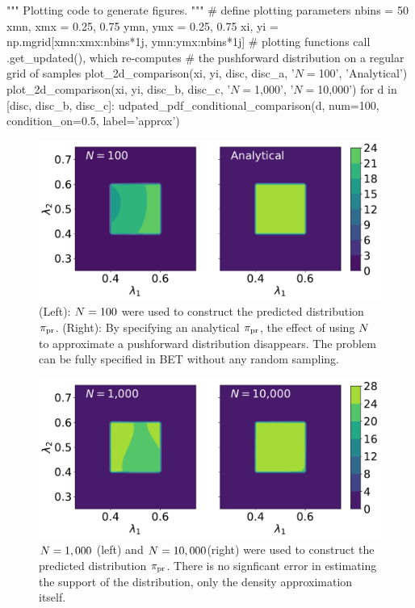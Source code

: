 \begin{python}
"""
Plotting code to generate figures.
"""
# define plotting parameters
nbins = 50
xmn, xmx = 0.25, 0.75
ymn, ymx = 0.25, 0.75
xi, yi = np.mgrid[xmn:xmx:nbins*1j, ymn:ymx:nbins*1j]
# plotting functions call .get_updated(), which re-computes
# the pushforward distribution on a regular grid of samples
plot_2d_comparison(xi, yi, disc, disc_a, '$N=$100', 'Analytical')
plot_2d_comparison(xi, yi, disc_b, disc_c, '$N=$1,000', '$N=$10,000')
for d in [disc, disc_b, disc_c]:
    udpated_pdf_conditional_comparison(d, num=100, condition_on=0.5, label='approx')
\end{python}

\begin{figure}[ht]
\begin{minipage}{.975\textwidth}
\includegraphics[width=\linewidth]{./examples/identity/samp/N100_N100-vs-Analytical_N100.pdf}
\end{minipage}
\caption{
(Left): $N=100$ were used to construct the predicted distribution $\operatorname*{\pi_{pr}}$.
(Right): By specifying an analytical $\operatorname*{\pi_{pr}}$, the effect of using $N$ to approximate a pushforward distribution disappears. The problem can be fully specified in BET without any random sampling.
}
\label{fig:ex:identity_sampling_exact}
\end{figure}

\begin{figure}[ht]
\begin{minipage}{.975\textwidth}
\includegraphics[width=\linewidth]{./examples/identity/samp/N1-000_N1000-vs-N10-000_N10000.pdf}
\end{minipage}
\caption{
$N=1,000$ (left) and $N=10,000$(right) were used to construct the predicted distribution $\operatorname*{\pi_{pr}}$.
There is no signficant error in estimating the support of the distribution, only the density approximation itself.
}
\label{fig:ex:identity_sampling_approx}
\end{figure}

